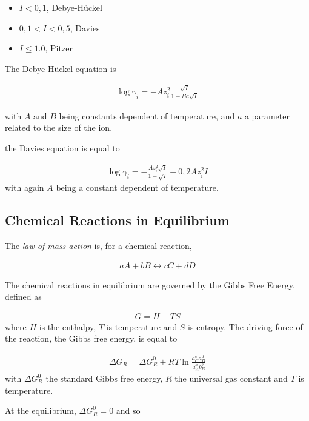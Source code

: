 \documentclass[11pt,twoside]{report}
\begin{document}
\begin{itemize}
   \item $I<0,1$, Debye-Hückel
   \item $0,1 < I < 0,5$, Davies 
   \item $I \leq 1.0$, Pitzer
\end{itemize}

The Debye-Hückel equation is 

\begin{align}
   \log \gamma_{i} = -Az_{i}^{2}\frac{\sqrt{I}}{1 + Ba\sqrt{I}}
\end{align}

with $A$ and $B$ being constants dependent of temperature, and $a$ a parameter related to the size of the ion. 

the Davies equation is equal to 

\begin{align}
    \log \gamma_{i} = -\frac{Az_{i}^{2}\sqrt{I}}{1 + \sqrt{I}} + 0,2Az_{i}^{2}I
\end{align}
with again $A$ being a constant dependent of temperature. 





\subsection{Chemical Reactions in Equilibrium}\label{secequi}
The \textit{law of mass action} is, for a chemical reaction, 

\begin{align}
   aA + bB \longleftrightarrow cC + dD
\end{align}

The chemical reactions in equilibrium are governed by the Gibbs Free Energy, defined as

\begin{align}
   G = H - TS
\end{align}
where $H$ is the enthalpy, $T$ is temperature and $S$ is entropy. The driving force of the reaction, the Gibbs free energy, is equal to 

\begin{align}
   \Delta G_{R} =  \Delta G_{R}^{0} + RT\ln \frac{a_{C}^{c}a_{D}^{d}}{a_{A}^{a}b_{B}^{b}}
\end{align}
with $\Delta G_{R}^{0}$ the standard Gibbs free energy, $R$ the universal gas constant and $T$ is temperature.

At the equilibrium, $\Delta G_{R}^{0} = 0$ and so
\end{document}
